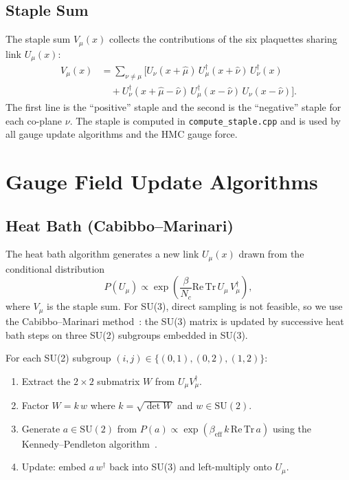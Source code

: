 \documentclass[12pt]{article}
\newcommand{\ReTr}{\mathrm{Re\,Tr}}
\newcommand{\code}[1]{\texttt{#1}}
\begin{document}
\subsection{Staple Sum}

The staple sum $V_\mu(x)$ collects the contributions of the six plaquettes sharing link $U_\mu(x)$:
\begin{align}
\label{eq:staple}
V_\mu(x) &= \sum_{\nu \neq \mu} \Big[
U_\nu(x + \hat{\mu}) \, U_\mu^\dagger(x + \hat{\nu}) \, U_\nu^\dagger(x) \nonumber \\
&\quad + U_\nu^\dagger(x + \hat{\mu} - \hat{\nu}) \, U_\mu^\dagger(x - \hat{\nu}) \, U_\nu(x - \hat{\nu})
\Big].
\end{align}
The first line is the ``positive'' staple and the second is the ``negative'' staple for each co-plane $\nu$. The staple is computed in \code{compute\_staple.cpp} and is used by all gauge update algorithms and the HMC gauge force.


\section{Gauge Field Update Algorithms}
\label{sec:gauge_updates}

\subsection{Heat Bath (Cabibbo--Marinari)}
\label{sec:heatbath}

The heat bath algorithm generates a new link $U_\mu(x)$ drawn from the conditional distribution
\begin{equation}
P(U_\mu) \propto \exp\!\left(\frac{\beta}{N_c} \ReTr \, U_\mu \, V_\mu^\dagger \right),
\end{equation}
where $V_\mu$ is the staple sum. For SU(3), direct sampling is not feasible, so we use the Cabibbo--Marinari method~\cite{CabibboMarinari1982}: the SU(3) matrix is updated by successive heat bath steps on three SU(2) subgroups embedded in SU(3).

For each SU(2) subgroup $(i,j) \in \{(0,1), (0,2), (1,2)\}$:
\begin{enumerate}
\item Extract the $2\times 2$ submatrix $W$ from $U_\mu V_\mu^\dagger$.
\item Factor $W = k \, w$ where $k = \sqrt{\det W}$ and $w \in \mathrm{SU}(2)$.
\item Generate $a \in \mathrm{SU}(2)$ from $P(a) \propto \exp(\beta_{\mathrm{eff}} \, k \, \ReTr \, a)$ using the Kennedy--Pendleton algorithm~\cite{KennedyPendleton1985}.
\item Update: embed $a \, w^\dagger$ back into SU(3) and left-multiply onto $U_\mu$.
\end{enumerate}
\end{document}
